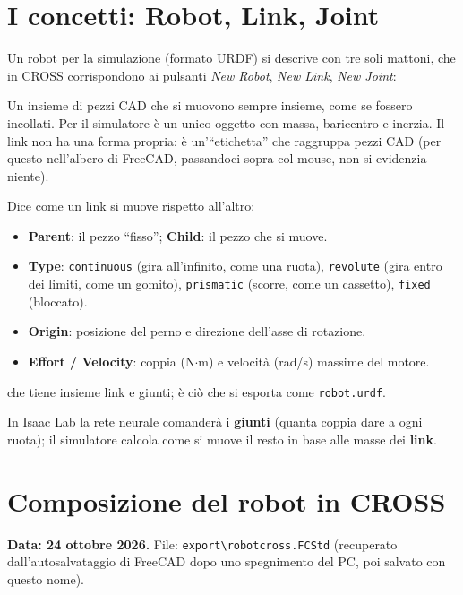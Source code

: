 \documentclass[11pt,a4paper]{article}
\renewcommand{\_}{\oldunderscore\allowbreak}
\begin{document}
\section{I concetti: Robot, Link, Joint}
Un robot per la simulazione (formato URDF) si descrive con tre soli mattoni, che in CROSS corrispondono
ai pulsanti \emph{New Robot}, \emph{New Link}, \emph{New Joint}:

\begin{description}[leftmargin=*]
  \item[Link = un pezzo rigido.] Un insieme di pezzi CAD che si muovono sempre insieme, come se fossero
    incollati. Per il simulatore \`e un unico oggetto con massa, baricentro e inerzia. Il link non ha una
    forma propria: \`e un'``etichetta'' che raggruppa pezzi CAD (per questo nell'albero di FreeCAD,
    passandoci sopra col mouse, non si evidenzia niente).
  \item[Joint = il collegamento tra due link.] Dice come un link si muove rispetto all'altro:
    \begin{itemize}
      \item \textbf{Parent}: il pezzo ``fisso''; \textbf{Child}: il pezzo che si muove.
      \item \textbf{Type}: \texttt{continuous} (gira all'infinito, come una ruota), \texttt{revolute}
        (gira entro dei limiti, come un gomito), \texttt{prismatic} (scorre, come un cassetto),
        \texttt{fixed} (bloccato).
      \item \textbf{Origin}: posizione del perno e direzione dell'asse di rotazione.
      \item \textbf{Effort / Velocity}: coppia (N$\cdot$m) e velocit\`a (rad/s) massime del motore.
    \end{itemize}
  \item[Robot = il contenitore] che tiene insieme link e giunti; \`e ci\`o che si esporta come
    \texttt{robot.urdf}.
\end{description}

In Isaac Lab la rete neurale comander\`a i \textbf{giunti} (quanta coppia dare a ogni ruota); il
simulatore calcola come si muove il resto in base alle masse dei \textbf{link}.

\section{Composizione del robot in CROSS}
\textbf{Data: 24 ottobre 2026.} File: \texttt{export\textbackslash robot\_cross.FCStd}
(recuperato dall'autosalvataggio di FreeCAD dopo uno spegnimento del PC, poi salvato con questo nome).
\end{document}
